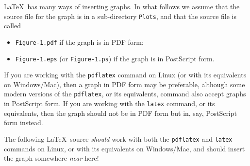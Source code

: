 \LaTeX\ has many ways of inserting graphs. In what follows we assume
that the source file for the graph is in a sub-directory
\texttt{Plots}, and that the source file is called
\begin{itemize}
\item \texttt{Figure-1.pdf} if the graph is in PDF form;
\item \texttt{Figure-1.eps} (or \texttt{Figure-1.ps}) if the graph is in
  PostScript form.
\end{itemize}
If you are working with the \texttt{pdflatex} command on Linux (or
with its equivalents on Windows/Mac), then a graph in PDF form may be
preferable, although some modern versions of the \texttt{pdflatex}, or
its equivalents, command also accept graphs in PostScript form. If you
are working with the \texttt{latex} command, or its equivalents, then
the graph should not be in PDF form but in, say, PostScript form instead.

The following \LaTeX\ source \textsl{should} work with both the
\texttt{pdflatex} and \texttt{latex} commands on Linux, or with its
equivalents on Windows/Mac, and should insert the graph somewhere
\textsl{near} here!


